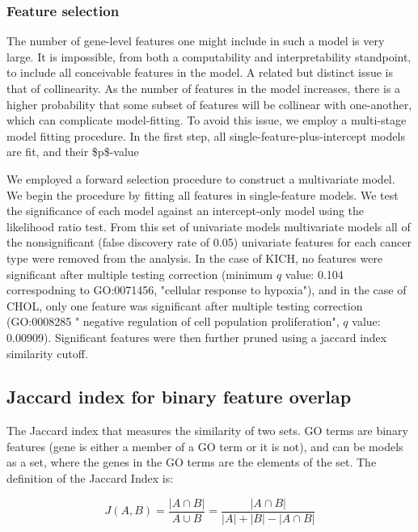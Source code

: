 \documentclass[11pt]{article}
\begin{document}
\subsubsection*{Feature selection}
\label{sec:orgcc5bab3}

The number of gene-level features one might include in such a model is very large.  It is impossible, from both a computability 
and interpretability standpoint, to include all conceivable features in the model. A related but distinct issue is that of collinearity.
As the number of features in the model increases, there is a higher probability that some subset of features will be collinear with one-another,
which can complicate model-fitting.  To avoid this issue, we employ a multi-stage model fitting procedure. In the first step, all single-feature-plus-intercept
models are fit, and their \$p\$-value 

We employed a forward selection procedure to construct a multivariate model.  We begin the procedure by 
fitting all features in single-feature models.  We test the significance of each model against an intercept-only model using the likelihood ratio test.
From this set of univariate models multivariate models all of the nonsignificant (false discovery rate of 0.05) univariate features for each cancer type
 were removed from the analysis.  In the case of KICH, no features were significant after multiple testing correction (minimum \(q\) value: 0.104 correspodning to GO:0071456, "cellular response to hypoxia"), and in the case of CHOL,
only one feature was significant after multiple testing correction (GO:0008285 " negative regulation of cell population proliferation", \(q\) value: 0.00909). Significant features were then 
further pruned using a jaccard index similarity cutoff.

\subsection*{Jaccard index for binary feature overlap}
\label{sec:org254816a}

The Jaccard index that measures the similarity of two sets.  GO terms are binary features (gene is either a member of a GO term or it is not), and can be 
models as a set, where the genes in the GO terms are the elements of the set. The definition of the Jaccard Index is:

$$ J(A,B) = \frac{|A \cap B |}{A \cup B} = \frac{| A \cap B|}{|A|+|B|-|A \cap B|} $$
\end{document}
